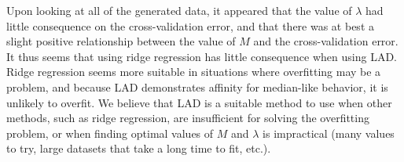 \documentclass{article}
\begin{document}
Upon looking at all of the generated data, it appeared that the value of $\lambda$ had little consequence on the cross-validation error, and that there was at best a slight positive relationship between the value of $M$ and the cross-validation error. It thus seems that using ridge regression has little consequence when using LAD. Ridge regression seems more suitable in situations where overfitting may be a problem, and because LAD demonstrates affinity for median-like behavior, it is unlikely to overfit. We believe that LAD is a suitable method to use when other methods, such as ridge regression, are insufficient for solving the overfitting problem, or when finding optimal values of $M$ and $\lambda$ is impractical (many values to try, large datasets that take a long time to fit, etc.).
\end{document}
